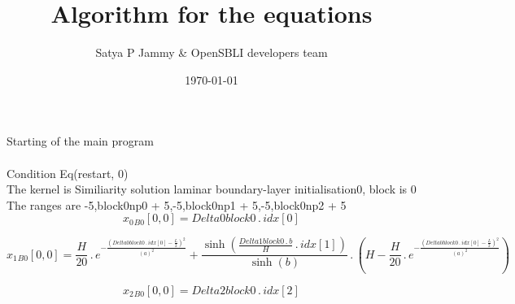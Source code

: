 \documentclass{article}
\title{Algorithm for the equations}
\author{Satya P Jammy \& OpenSBLI developers team}
\date{\today}
\begin{document}
\maketitle
\noindent Starting of the main program\\
\\\noindent Condition Eq(restart, 0)\\\noindent The kernel is Similiarity solution laminar boundary-layer initialisation0, block is 0\\\noindent The ranges are -5,block0np0 + 5,-5,block0np1 + 5,-5,block0np2 + 5\\\begin{dmath}{x_{0}{_{B0}}}[{0,0}] = Delta0block0 \,.\, {idx}[{0}]\end{dmath}

\begin{dmath}{x_{1}{_{B0}}}[{0,0}] = \frac{H}{20} \,.\, e^{- \frac{\left(Delta0block0 \,.\, {idx}[{0}] - \frac{L}{2} \right)^{2}}{\left(a \right)^{2}}} + \frac{\sinh{\left (\frac{Delta1block0 \,.\, b}{H} \,.\, {idx}[{1}] \right )}}{\sinh{\left (b 
\right )}} \,.\, \left(H - \frac{H}{20} \,.\, e^{- \frac{\left(Delta0block0 \,.\, {idx}[{0}] - \frac{L}{2} \right)^{2}}{\left(a \right)^{2}}}\right)\end{dmath}

\begin{dmath}{x_{2}{_{B0}}}[{0,0}] = Delta2block0 \,.\, {idx}[{2}]\end{dmath}
\end{document}
